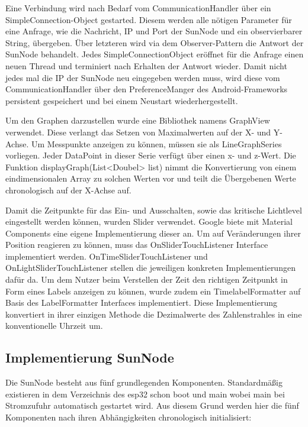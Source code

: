 Eine Verbindung wird nach Bedarf vom CommunicationHandler über ein \glqq SimpleConnection\grqq{}-Object gestarted. Diesem werden alle nötigen Parameter für eine Anfrage, wie die Nachricht, IP und Port der SunNode und ein observierbarer String, übergeben. Über letzteren wird via dem Observer-Pattern die Antwort der SunNode behandelt. Jedes SimpleConnectionObject eröffnet für die Anfrage einen neuen Thread und terminiert nach Erhalten der Antwort wieder. Damit nicht jedes mal die IP der SunNode neu eingegeben werden muss, wird diese vom CommunicationHandler über den \glqq PreferenceManger\grqq{} des Android-Frameworks persistent gespeichert und bei einem Neustart wiederhergestellt.

Um den Graphen darzustellen wurde eine Bibliothek namens \glqq GraphView\grqq{} verwendet. Diese verlangt das Setzen von Maximalwerten auf der X- und Y-Achse. Um Messpunkte anzeigen zu können, müssen sie als \glqq LineGraphSeries\grqq{} vorliegen. Jeder \glqq DataPoint\grqq{} in dieser Serie verfügt über einen x- und z-Wert. Die Funktion \glqq displayGraph(List<Doubel> list)\grqq{} nimmt die Konvertierung von einem eindimensionalen Array zu solchen Werten vor und teilt die Übergebenen Werte chronologisch auf der X-Achse auf.

Damit die Zeitpunkte für das Ein- und Ausschalten, sowie das kritische Lichtlevel eingestellt werden können, wurden Slider verwendet. Google biete mit \glqq Material Components\grqq{} eine eigene Implementierung dieser an. Um auf Veränderungen ihrer Position reagieren zu können, muss das OnSliderTouchListener Interface implementiert werden. \glqq OnTimeSliderTouchListener\grqq{} und \glqq OnLightSliderTouchListener\grqq{} stellen die jeweiligen konkreten Implementierungen dafür da. Um dem Nutzer beim Verstellen der Zeit den richtigen Zeitpunkt in Form eines Labels anzeigen zu können, wurde zudem ein \glqq TimelabelFormatter\grqq{} auf Basis des \glqq LabelFormatter\grqq{} Interfaces implementiert. Diese Implementierung konvertiert in ihrer einzigen Methode die Dezimalwerte des Zahlenstrahles in eine konventionelle Uhrzeit um.

\subsection{Implementierung SunNode}
Die SunNode besteht aus fünf grundlegenden Komponenten. Standardmäßig existieren in dem Verzeichnis des esp32 schon \glqq boot\grqq{} und \glqq main\grqq{} wobei main bei Stromzufuhr automatisch gestartet wird. Aus diesem Grund werden hier die fünf Komponenten nach ihren Abhängigkeiten chronologisch initialisiert:

